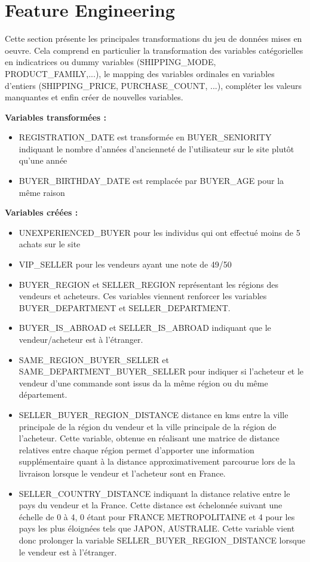 
\chapter{Feature Engineering}

Cette section présente les principales transformations du jeu de données mises en oeuvre.
Cela comprend en particulier la transformation des variables catégorielles en
indicatrices ou dummy variables (SHIPPING_MODE, PRODUCT_FAMILY,...), le mapping des variables 
ordinales en variables d'entiers (SHIPPING_PRICE, PURCHASE_COUNT, ...),
compléter les valeurs manquantes et enfin créer de nouvelles variables.

\textbf{Variables transformées :}

\begin{itemize}
\item REGISTRATION_DATE est transformée en BUYER_SENIORITY indiquant le nombre d'années
d'ancienneté de l'utilisateur sur le site plutôt qu'une année 
\item BUYER_BIRTHDAY_DATE est remplacée par BUYER_AGE pour la même raison
\end{itemize}

\textbf{Variables créées :}

\begin{itemize}
\item UNEXPERIENCED_BUYER pour les individus qui ont effectué moins de 5 achats sur le site
\item VIP_SELLER pour les vendeurs ayant une note de 49/50
\item BUYER_REGION et SELLER_REGION représentant les régions des vendeurs et acheteurs.
Ces variables viennent renforcer les variables BUYER_DEPARTMENT et SELLER_DEPARTMENT.
\item BUYER_IS_ABROAD et SELLER_IS_ABROAD indiquant que le vendeur/acheteur est à l'étranger.
\item SAME_REGION_BUYER_SELLER et SAME_DEPARTMENT_BUYER_SELLER pour indiquer si l'acheteur
et le vendeur d'une commande sont issus da la même région ou du même département.
\item SELLER_BUYER_REGION_DISTANCE distance en kms entre la ville principale de la région
du vendeur et la ville principale de la région de l'acheteur. Cette variable, obtenue en 
réalisant une matrice de distance relatives entre chaque région permet d'apporter une
information supplémentaire quant à la distance approximativement parcourue lors de la 
livraison lorsque le vendeur et l'acheteur sont en France. 
\item SELLER_COUNTRY_DISTANCE indiquant la distance relative entre le pays du vendeur et la France. 
Cette distance est échelonnée suivant une échelle de 0 à 4, 0 étant pour FRANCE METROPOLITAINE et 4 pour les 
pays les plus éloignées tels que JAPON, AUSTRALIE. Cette variable vient donc prolonger la variable
SELLER_BUYER_REGION_DISTANCE lorsque le vendeur est à l'étranger.
\end{itemize}

